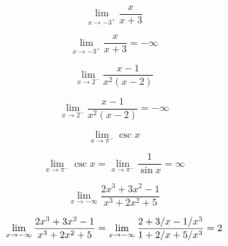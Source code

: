 \documentclass[fleqn,addpoints]{exam}
\begin{document}
\begin{questions}



\question[5]
\label{limit:first}
\[
  \lim_{x \to -3^+} \frac{x}{x + 3}
\]
\begin{solution}[3 cm]
\[
  \lim_{x \to -3^+} \frac{x}{x + 3} = - \infty
\]
\end{solution}


\question[5]
\label{limit:first}
\[
  \lim_{x \to 2^-} \frac{x - 1}{x^2(x - 2)}
\]
\begin{solution}[3 cm]
\[
  \lim_{x \to 2^-} \frac{x - 1}{x^2(x - 2)} = -\infty
\]
\end{solution}

\question[5]
\[
  \lim_{x \to \pi^-} \csc x
\]
\begin{solution}
\[
  \lim_{x \to \pi^-} \csc x = \lim_{x \to \pi^-} \frac{1}{\sin x} = \infty
\]
\end{solution}

\pagebreak




\question[5]
\[
  \lim_{x \to -\infty} \frac{2x^3 + 3x^2 - 1}{x^3 + 2x^2 + 5}
\]
\begin{solution}[5 cm]
\[
  \lim_{x \to -\infty} \frac{2x^3 + 3x^2 - 1}{x^3 + 2x^2 + 5} 
    = \lim_{x \to -\infty} \frac{2 + 3/x - 1/x^3}{1 + 2/x + 5/x^3} = 2 \\   
\]


\end{solution}
\end{questions}
\end{document}
